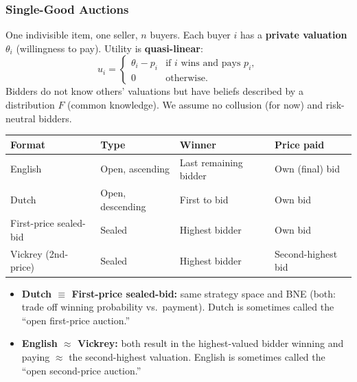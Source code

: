 \separator

\subsubsection{Single-Good Auctions}

\begin{defbox}
One indivisible item, one seller, $n$ buyers. Each buyer $i$ has a \textbf{private valuation} $\theta_i$ (willingness to pay). Utility is \textbf{quasi-linear}:
\[
  u_i = \begin{cases} \theta_i - p_i & \text{if } i \text{ wins and pays } p_i, \\ 0 & \text{otherwise.} \end{cases}
\]
Bidders do not know others' valuations but have beliefs described by a distribution $F$ (common knowledge). We assume no collusion (for now) and risk-neutral bidders.
\end{defbox}

\begin{center}
\renewcommand{\arraystretch}{1.3}
\begin{tabular}{llll}
\toprule
\textbf{Format} & \textbf{Type} & \textbf{Winner} & \textbf{Price paid} \\
\midrule
English         & Open, ascending  & Last remaining bidder & Own (final) bid \\
Dutch           & Open, descending & First to bid          & Own bid \\
First-price sealed-bid & Sealed & Highest bidder & Own bid \\
Vickrey (2nd-price)    & Sealed & Highest bidder & Second-highest bid \\
\bottomrule
\end{tabular}
\end{center}

\begin{tipbox}
\begin{itemize}
  \item \textbf{Dutch $\equiv$ First-price sealed-bid:} same strategy space and BNE (both: trade off winning probability vs.\ payment). Dutch is sometimes called the ``open first-price auction.''
  \item \textbf{English $\approx$ Vickrey:} both result in the highest-valued bidder winning and paying $\approx$ the second-highest valuation. English is sometimes called the ``open second-price auction.''
\end{itemize}
\end{tipbox}

